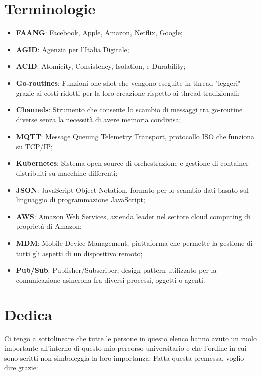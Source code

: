 \documentclass[a4paper, titlepage, 12pt, openright, twoside]{book}
\begin{document}
\chapter{Terminologie}\label{chap:terminologie}

\begin{itemize}
	\item \textbf{FAANG}: Facebook, Apple, Amazon, Netflix, Google;
	\item \textbf{AGID}: Agenzia per l'Italia Digitale;
	\item \textbf{ACID}: Atomicity, Consistency, Isolation, e Durability;
	\item \textbf{Go-routines}: Funzioni one-shot che vengono eseguite in thread "leggeri" grazie ai costi ridotti per la loro creazione rispetto ai thread tradizionali;
	\item \textbf{Channels}: Strumento che consente lo scambio di messaggi tra go-routine diverse senza la necessità di avere memoria condivisa;
	\item \textbf{MQTT}: Message Queuing Telemetry Transport, protocollo ISO che funziona su TCP/IP;
	\item \textbf{Kubernetes}: Sistema open source di orchestrazione e gestione di container distribuiti su macchine differenti;
	\item \textbf{JSON}: JavaScript Object Notation, formato per lo scambio dati basato sul linguaggio di programmazione JavaScript;
	\item \textbf{AWS}: Amazon Web Services, azienda leader nel settore cloud computing di proprietà di Amazon;
	\item \textbf{MDM}: Mobile Device Management, piattaforma che permette la gestione di tutti gli aspetti di un dispositivo remoto;
	\item \textbf{Pub/Sub}: Publisher/Subscriber, design pattern utilizzato per la comunicazione asincrona fra diversi processi, oggetti o agenti.
\end{itemize}

\chapter{Dedica}\label{chap:dedica}

Ci tengo a sottolineare che tutte le persone in questo elenco hanno avuto un ruolo importante all'interno di questo mio percorso universitario e che l'ordine in cui sono scritti non simboleggia la loro importanza. Fatta questa premessa, voglio dire grazie:
\end{document}
